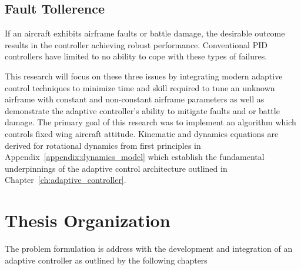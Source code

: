 \subsection{Fault Tollerence}
If an aircraft exhibits airframe faults or battle damage, the desirable outcome results in the controller achieving robust performance.  Conventional \ac{PID} controllers have limited to no ability to cope with these types of failures.

This research will focus on these three issues by integrating modern adaptive control techniques to minimize time and skill required to tune an unknown airframe with constant and non-constant airframe parameters as well as demonstrate the adaptive controller's ability to mitigate faults and or battle damage.  The primary goal of this research was to implement an algorithm which controls fixed wing aircraft attitude.  Kinematic and dynamics equations are derived for rotational dynamics from first principles in Appendix~\ref{appendix:dynamics_model} which establish the fundamental underpinnings of the adaptive control architecture outlined in Chapter~\ref{ch:adaptive_controller}. 

\section{Thesis Organization}

The problem formulation is address with the development and integration of an adaptive controller as outlined by the following chapters

